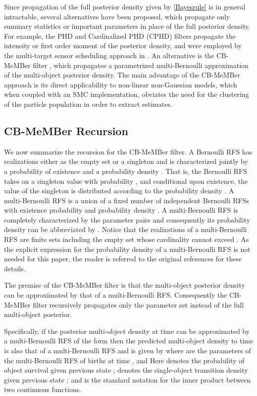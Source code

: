 \documentclass[twocolumn]{autart}
\begin{document}
Since propagation of the full posterior density given by \eqref{Bayesrule}
is in general intractable, several alternatives have been proposed, which
propagate only summary statistics or important parameters in place of the
full posterior density. For example, the PHD and Cardinalized PHD (CPHD)
filters \cite{Mah03,MahlerCPHD,VoMaGMPHD05,VoAES,VoGaussianCPHD07} propagate
the intensity or first order moment of the posterior density, and were employed by the
multi-target sensor scheduling approach in \cite{RVC11}. An alternative is the
CB-MeMBer filter \cite{Mah07,VVC09}, which propagates a parametrized
multi-Bernoulli approximation of the multi-object posterior density.  The main advantage of the CB-MeMBer approach is its direct
applicability to non-linear non-Gaussian models, which when coupled with an
SMC implementation, obviates the need for the clustering of the particle
population in order to extract estimates.

\subsection{CB-MeMBer Recursion}

We now summarize the recursion for the CB-MeMBer filter. A Bernoulli RFS  has realizations either as the empty set or a
singleton and is characterized jointly by a probability of existence  and a probability density . That is, the Bernoulli RFS
takes on a singleton value with probability , and conditional upon
existence, the value of the singleton is distributed according to the
probability density . A multi-Bernoulli RFS is a union of a fixed number  of independent Bernoulli RFSs  with existence
probability  and probability density . A
multi-Bernoulli RFS is completely characterized by the parameter pairs  and consequently its probability density can be
abbreviated by . Notice
that the realizations of a multi-Bernoulli RFS are finite sets including the
empty set whose cardinality cannot exceed . As the explicit expression
for the probability density of a multi-Bernoulli RFS is not needed for this
paper, the reader is referred to the original references \cite {Mah07,VVC09} for these details.

The premise of the CB-MeMBer filter is that the multi-object posterior
density can be approximated by that of a multi-Bernoulli RFS. Consequently
the CB-MeMBer filter recursively propagates only the parameter set  instead of the full multi-object posterior.

Specifically, if the posterior multi-object density at time  can be approximated by a
multi-Bernoulli RFS of the form   then the predicted multi-object density to time  is also that of a
multi-Bernoulli RFS and is given by
where  are the parameters of the multi-Bernoulli
RFS of births at time , and
Here  denotes the probability of object survival
given previous state ;  denotes the single-object transition density given
previous state ; and  is the standard notation for the inner product
between two continuous functions.
\end{document}
